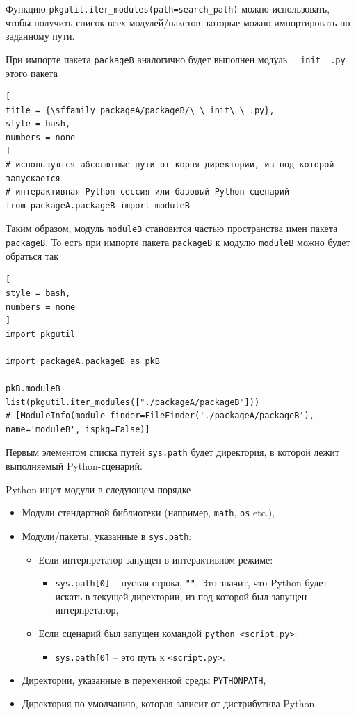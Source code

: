 \documentclass[%
	11pt,
	a4paper,
	utf8,
		]{article}
\begin{document}
Функцию \texttt{pkgutil.iter\_modules(path=search\_path)} можно использовать, чтобы получить список всех модулей/пакетов, которые можно импортировать по заданному пути.

При импорте пакета \texttt{packageB} аналогично будет выполнен модуль \texttt{\_\_init\_\_.py} этого пакета
\begin{lstlisting}[
title = {\sffamily packageA/packageB/\_\_init\_\_.py},
style = bash,
numbers = none	
]
# используются абсолютные пути от корня директории, из-под которой запускается
# интерактивная Python-сессия или базовый Python-сценарий
from packageA.packageB import moduleB
\end{lstlisting}

Таким образом, модуль \texttt{moduleB} становится частью пространства имен пакета \texttt{packageB}. То есть при импорте пакета \texttt{packageB} к модулю \texttt{moduleB} можно будет обраться так
\begin{lstlisting}[
style = bash,
numbers = none	
]
import pkgutil

import packageA.packageB as pkB

pkB.moduleB
list(pkgutil.iter_modules(["./packageA/packageB"]))
# [ModuleInfo(module_finder=FileFinder('./packageA/packageB'), name='moduleB', ispkg=False)]
\end{lstlisting}

Первым элементом списка путей \texttt{sys.path} будет директория, в которой лежит выполняемый Python-сценарий.

Python ищет модули в следующем порядке
\begin{itemize}
	\item Модули стандартной библиотеки (например, \texttt{math}, \texttt{os} etc.),
	
	\item Модули/пакеты, указанные в \texttt{sys.path}:
	\begin{itemize}
		\item Если интерпретатор запущен в интерактивном режиме:
		\begin{itemize}
			\item \texttt{sys.path[0]} -- пустая строка, \verb|""|. Это значит, что Python будет искать в текущей директории, из-под которой был запущен интерпретатор,
		\end{itemize}
	
	    \item Если сценарий был запущен командой \texttt{python <script.py>}:
	    \begin{itemize}
	    	\item \texttt{sys.path[0]} -- это путь к \texttt{<script.py>}.
	    \end{itemize}
	\end{itemize}

    \item Директории, указанные в переменной среды \texttt{PYTHONPATH},
    
    \item Директория по умолчанию, которая зависит от дистрибутива Python.
\end{itemize}
\end{document}
